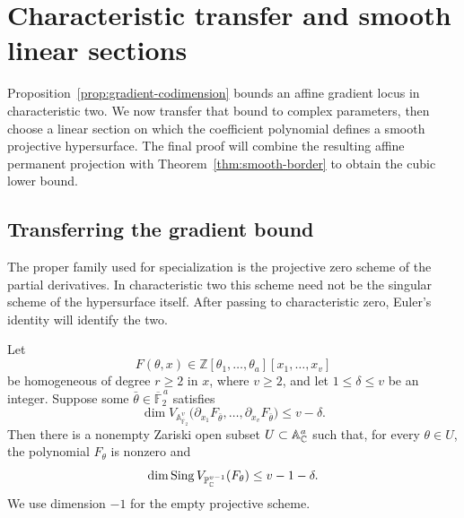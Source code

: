 \section{Characteristic transfer and smooth linear sections}
\label{sec:transfer}

Proposition~\ref{prop:gradient-codimension} bounds an affine gradient
locus in characteristic two.  We now transfer that bound to complex
parameters, then choose a linear section on which the coefficient
polynomial defines a smooth projective hypersurface.  The final proof
will combine the resulting affine permanent projection with
Theorem~\ref{thm:smooth-border} to obtain the cubic lower bound.

\subsection{Transferring the gradient bound}

The proper family used for specialization is the projective zero scheme
of the partial derivatives.  In characteristic two this scheme need not
be the singular scheme of the hypersurface itself.  After passing to
characteristic zero, Euler's identity will identify the two.

\begin{lemma}
\label{lem:characteristic-transfer}
Let
\[
 F(\theta,x)\in
 \mathbb Z[\theta_1,\ldots,\theta_a][x_1,\ldots,x_v]
\]
be homogeneous of degree \(r\ge2\) in \(x\), where \(v\ge2\), and let
\(1\le\delta\le v\) be an integer.  Suppose some
\(\bar\theta\in\overline{\mathbb F}_2^{\,a}\) satisfies
\[
 \dim V_{\mathbb A^v_{\overline{\mathbb F}_2}}
       \bigl(\partial_{x_1}F_{\bar\theta},\ldots,
             \partial_{x_v}F_{\bar\theta}\bigr)
 \le v-\delta.
\]
Then there is a nonempty Zariski open subset
\(U\subset\mathbb A^a_{\mathbb C}\) such that, for every \(\theta\in U\),
the polynomial \(F_\theta\) is nonzero and
\begin{equation}
 \dim\operatorname{Sing}V_{\mathbb P^{v-1}_{\mathbb C}}(F_\theta)
 \le v-1-\delta.
 \label{eq:transfer-singular-bound}
\end{equation}
We use dimension \(-1\) for the empty projective scheme.
\end{lemma}

